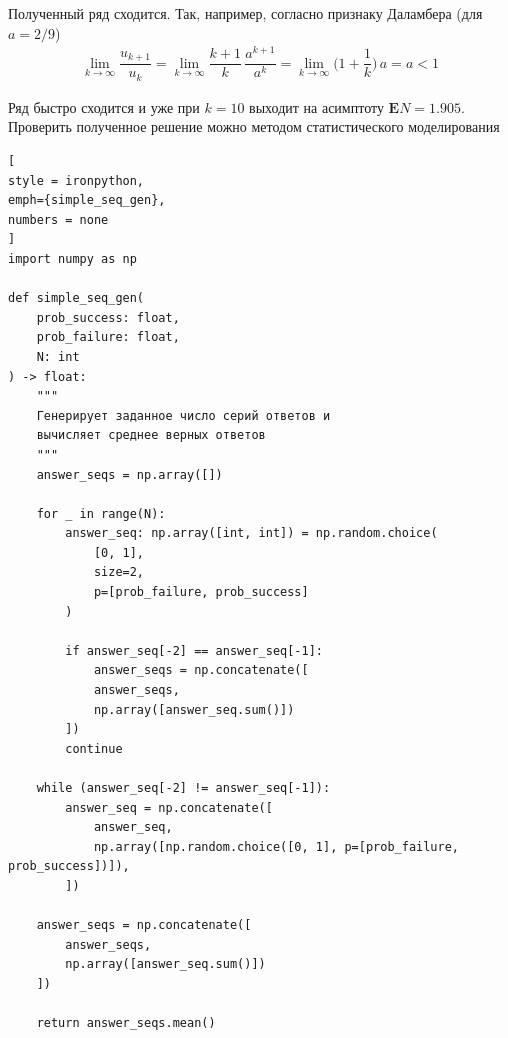 \documentclass[%
	11pt,
	a4paper,
	utf8,
		]{article}
\begin{document}
Полученный ряд сходится. Так, например, согласно признаку Даламбера (для $ a = 2/9 $)
\begin{align*}
	\lim_{k \to \infty}\dfrac{u_{k+1}}{u_k} =\lim_{k \to \infty} \dfrac{k + 1}{k}\, \dfrac{a^{k+1}}{a^k} = \lim_{k \to \infty} \bigg( 1 + \dfrac{1}{k} \bigg) \, a = a < 1
\end{align*}

Ряд быстро сходится и уже при $ k=10 $ выходит на асимптоту $ \boxed{\mathbf{E}N = 1.905} $. Проверить полученное решение можно методом статистического моделирования 
\begin{lstlisting}[
style = ironpython,
emph={simple_seq_gen},
numbers = none
]
import numpy as np

def simple_seq_gen(
	prob_success: float,
	prob_failure: float,
	N: int
) -> float:
	"""
	Генерирует заданное число серий ответов и
	вычисляет среднее верных ответов
	"""
	answer_seqs = np.array([])

	for _ in range(N):
		answer_seq: np.array([int, int]) = np.random.choice(
			[0, 1],
			size=2,
			p=[prob_failure, prob_success]
		)

		if answer_seq[-2] == answer_seq[-1]:
			answer_seqs = np.concatenate([
			answer_seqs,
			np.array([answer_seq.sum()])
		])
		continue

	while (answer_seq[-2] != answer_seq[-1]):
		answer_seq = np.concatenate([
			answer_seq,
			np.array([np.random.choice([0, 1], p=[prob_failure, prob_success])]),
		])

	answer_seqs = np.concatenate([
		answer_seqs,
		np.array([answer_seq.sum()])
	])

	return answer_seqs.mean()
\end{lstlisting}




\listoffigures{}

\begin{thebibliography}{99}
	
	
	
	
\end{thebibliography}
\end{document}
